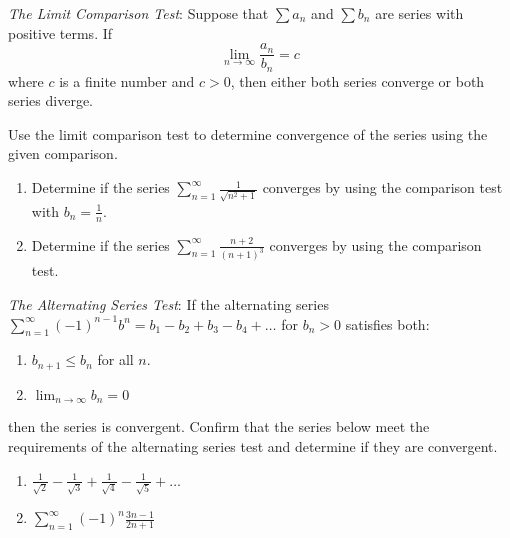 \documentclass[12 pt]{article}
\begin{document}
\newpage

\textit{The Limit Comparison Test}: Suppose that $\sum a_{n}$ and $\sum b_{n}$ are series with positive terms. If $$ \lim_{n \to \infty} \frac{a_{n}}{b_{n}} = c$$ where $c$ is a finite number and $c>0$, then either both series converge or both series diverge. 

Use the limit comparison test to determine convergence of the series using the given comparison. 

\begin{enumerate}

\item Determine if the series ${\displaystyle \sum_{n=1}^{\infty} \frac{1}{\sqrt{n^2+1}}}$ converges by using the comparison test with $b_{n}=\frac{1}{n}$. 


\item Determine if the series ${\displaystyle \sum_{n=1}^{\infty} \frac{n+2}{(n+1)^3}}$ converges by using the comparison test. 


\end{enumerate}

\newpage

\textit {The Alternating Series Test}: If the alternating series ${\displaystyle \sum_{n=1}^{\infty} (-1)^{n-1} b^{n} = b_{1} - b_{2} + b_{3} - b_{4} + \dots}$ for $b_{n} > 0$ satisfies both:

\begin{enumerate}
\item$ b_{n+1} \leq b_{n}$ for all $n$.
\item $\lim_{n \to \infty} b_{n} = 0$
\end{enumerate}

then the series is convergent. Confirm that the series below meet the requirements of the alternating series test and determine if they are convergent.

\begin{enumerate}

\item ${\displaystyle \frac{1}{\sqrt{2}} - \frac{1}{\sqrt{3}} + \frac{1}{\sqrt{4}} - \frac{1}{\sqrt{5}} + \dots }$


\item ${\displaystyle \sum_{n=1}^{\infty} (-1)^{n} \frac{3n-1}{2n+1} }$




\end{enumerate}
\end{document}
